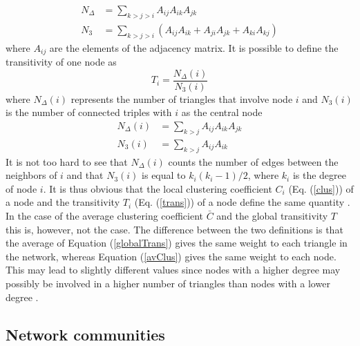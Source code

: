 \documentclass[11 pt , letterpaper , twoside , openright]{book}
\begin{document}
\begin{align}
	N_{\Delta} &= \sum_{k > j > i} A_{ij}A_{ik}A_{jk} \\
	N_3 &= \sum_{k > j > i} (A_{ij}A_{ik} + A_{ji}A_{jk} + A_{ki}A_{kj})
\end{align}
where $A_{ij}$ are the elements of the adjacency matrix. It is possible to define the transitivity of one node as \cite{F.Costa2007}
\begin{equation}\label{trans}
	T_i = \frac{N_{\Delta}(i)}{N_3(i)}
\end{equation}
where $N_{\Delta}(i)$ represents the number of triangles that involve node $i$ and $N_3(i)$ is the number of connected triples with $i$ as the central node \cite{F.Costa2007}
\begin{align}
	N_{\Delta}(i) &= \sum_{k > j} A_{ij}A_{ik}A_{jk} \\
	N_3(i) &= \sum_{k > j} A_{ij}A_{ik}
\end{align}
It is not too hard to see that $N_{\Delta}(i)$ counts the number of edges between the neighbors of $i$ and that $N_3(i)$ is equal to $k_i(k_i-1)/2$, where $k_i$ is the degree of node $i$. It is thus obvious that the local clustering coefficient $C_i$ (Eq. (\ref{clus})) of a node and the transitivity $T_i$ (Eq. (\ref{trans})) of a node define the same quantity \cite{F.Costa2007}. In the case of the average clustering coefficient $\bar{C}$ and the global transitivity $T$ this is, however, not the case. The difference between the two definitions is that the average of Equation (\ref{globalTrans}) gives the same weight to each triangle in the network, whereas Equation (\ref{avClus}) gives the same weight to each node. This may lead to slightly different values since nodes with a higher degree may possibly be involved in a higher number of triangles than nodes with a lower degree \cite{F.Costa2007}.
	
\subsection{Network communities}

\end{document}
